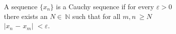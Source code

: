 \documentclass[preview]{standalone}
\begin{document}
\begin{center}
A sequence $\{x_n\}$ is a Cauchy sequence if for every $\varepsilon > 0$\\there exists an $N$$\in\:$$\mathbb{N}$ such that for all $m, n\:$$ \geq$$N$\\$|$$x_n$ $-$ $x_m$$|$ $<\varepsilon$.
\end{center}
\end{document}
